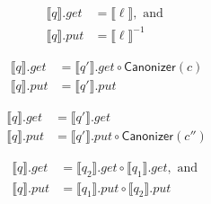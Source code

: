 \documentclass{svproc}
\newcommand{\kw}[1]{\ensuremath{\mathsf{#1}}}
\newcommand{\canonizer}{\ensuremath{\kw{Canonizer}}}
\begin{document}
 \begin{figure}[ht]
  \centering
  \begin{prooftree}
\end{prooftree}
  \begin{align*}
  \llbracket q \rrbracket.get &=  \llbracket \ell \rrbracket, \text{ and }\\
  \llbracket q \rrbracket.put &= \llbracket \ell \rrbracket^{-1}
  \end{align*}
 
\begin{prooftree}
\end{prooftree}
  \begin{align*}
  \llbracket q \rrbracket.get  &= \llbracket q'
  \rrbracket.get \circ \canonizer(c)\\
  \llbracket q \rrbracket.put &= \llbracket q' \rrbracket.put
  \end{align*}

  \begin{prooftree}
  
\end{prooftree}
  \begin{align*}
  \llbracket q \rrbracket.get &= \llbracket q'
  \rrbracket.get\\
  \llbracket q \rrbracket.put &= \llbracket q'
  \rrbracket.put \circ \canonizer(c'')
  \end{align*}
  
  \begin{prooftree}
\end{prooftree}
  \begin{align*}
  \llbracket q \rrbracket.get &= \llbracket q_2 \rrbracket.get\circ \llbracket
  q_1 \rrbracket.get, \text{ and }\\
  \llbracket q \rrbracket.put &= \llbracket q_1 \rrbracket.put \circ \llbracket
  q_2 \rrbracket.put
  \end{align*}


\end{figure}
\end{document}
